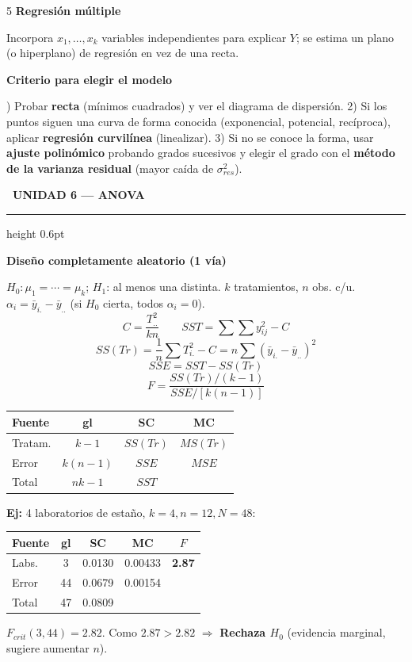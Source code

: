 \documentclass[9pt,a4paper]{article}
\newcommand{\bodysize}{\fontsize{7.5}{8.7}\selectfont}
\newcommand{\notesize}{\fontsize{6.4}{7.4}\selectfont}
\newcommand{\subsize}{\fontsize{8.6}{10}\selectfont\bfseries}
\newcommand{\unitsize}{\fontsize{9.8}{11.3}\selectfont\bfseries}
\newcommand{\unithead}[2]{%
  \par\vspace{2pt}
  \noindent\colorbox{#1!22}{\textcolor{#1!65!black}{\unitsize\ #2}}%
  \par\vspace{1pt}\hrule height 0.6pt \color{#1!55!black}\vspace{1.5pt}\color{black}%
}
\newcommand{\topic}[2]{\subsize\textcolor{#1!60!black}{#2}\par\vspace{0.5pt}\bodysize}
\newcommand{\ejemplo}[1]{{\notesize\textbf{Ej:} #1\par}\bodysize}
\begin{document}
\begin{multicols}{5}
\topic{orange}{Regresión múltiple}
Incorpora $x_1,\ldots,x_k$ variables independientes para explicar $Y$; se estima un plano (o hiperplano) de regresión en vez de una recta.

\topic{orange}{Criterio para elegir el modelo}
1) Probar \textbf{recta} (mínimos cuadrados) y ver el diagrama de dispersión. 2) Si los puntos siguen una curva de forma conocida (exponencial, potencial, recíproca), aplicar \textbf{regresión curvilínea} (linealizar). 3) Si no se conoce la forma, usar \textbf{ajuste polinómico} probando grados sucesivos y elegir el grado con el \textbf{método de la varianza residual} (mayor caída de $\sigma_{res}^2$).

\unithead{green}{UNIDAD 6 --- ANOVA}

\topic{green}{Diseño completamente aleatorio (1 vía)}
$H_0:\mu_1=\cdots=\mu_k$; $H_1$: al menos una distinta. $k$ tratamientos, $n$ obs. c/u. $\alpha_i=\bar y_{i.}-\bar y_{..}$ (si $H_0$ cierta, todos $\alpha_i=0$).
\[
C=\frac{T_{..}^2}{kn} \qquad SST=\sum\sum y_{ij}^2-C
\]
{\notesize
\[
SS(Tr)=\frac{1}{n}\sum T_{i.}^2-C=n\sum(\bar y_{i.}-\bar y_{..})^2
\]
}
\[
SSE=SST-SS(Tr)
\]
\[
F=\frac{SS(Tr)/(k-1)}{SSE/[k(n-1)]}
\]
\begin{center}
{\notesize
\begin{tabular}{@{}l c c c@{}}
\toprule
Fuente & gl & SC & MC \\
\midrule
Tratam. & $k-1$ & $SS(Tr)$ & $MS(Tr)$ \\
Error & $k(n-1)$ & $SSE$ & $MSE$ \\
Total & $nk-1$ & $SST$ & \\
\bottomrule
\end{tabular}
}
\end{center}

\ejemplo{4 laboratorios de estaño, $k=4,n=12,N=48$:
\begin{center}
{\notesize
\setlength{\tabcolsep}{3pt}
\begin{tabular}{@{}l c c c c@{}}
\toprule
Fuente & gl & SC & MC & $F$ \\
\midrule
Labs. & 3 & 0.0130 & 0.00433 & \textbf{2.87} \\
Error & 44 & 0.0679 & 0.00154 & \\
\midrule
Total & 47 & 0.0809 & & \\
\bottomrule
\end{tabular}
}
\end{center}
$F_{crit}(3,44)=2.82$. Como $2.87>2.82$ $\Rightarrow$ \textbf{Rechaza $H_0$} (evidencia marginal, sugiere aumentar $n$).}


\end{multicols}
\end{document}

